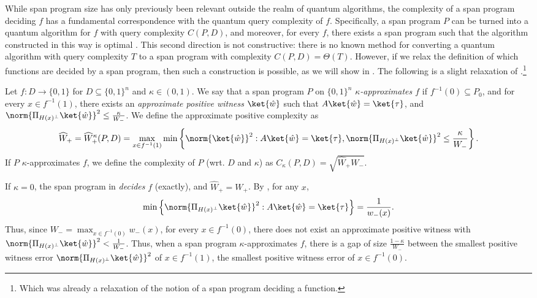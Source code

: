 \documentclass{toc}
\begin{document}
While span program size has only previously been relevant outside the realm of quantum algorithms, the complexity of a span program deciding $f$ has a fundamental correspondence with the quantum query complexity of $f$.  Specifically, a span program $P$ can be turned into a quantum algorithm for $f$ with query complexity $C(P,D)$, and moreover, for every $f$, there exists a span program such that the algorithm constructed in this way is optimal \cite{Rei09}. This second direction is not constructive: there is no known method for converting a quantum algorithm with query complexity $T$ to a span program with complexity $C(P,D)=\Theta(T)$. However, if we relax the definition of which functions are decided by a span program, then such a construction is possible, as we will show in . The following is a slight relaxation of \cite[Definition~2.6]{IJ15}.\footnote{Which was already a relaxation of the notion of a span program deciding a function.} %

\begin{definition}\label{def:approx-span}
Let $f:D\rightarrow\{0,1\}$ for $D\subseteq \{0,1\}^n$ and $\kappa\in(0,1)$. We say that a span program $P$ on $\{0,1\}^n$ \emph{$\kappa$-approximates $f$} if $f^{-1}(0)\subseteq P_0$, and for every $x\in f^{-1}(1)$, there exists an \emph{approximate positive witness} $\ket{\hat{w}}$ such that $A\ket{\hat{w}}=\ket{\tau}$, and $\norm{\Pi_{H(x)^\bot}\ket{\hat{w}}}^2\leq \frac{\kappa}{W_-}$. We define the approximate positive complexity as 
$$\widehat{W}_+=\widehat{W}_+^{\kappa}(P,D)=\max_{x\in f^{-1}(1)}\min\left\{\norm{\ket{\hat w}}^2 : A\ket{\hat w}=\ket{\tau}, \norm{\Pi_{H(x)^\bot}\ket{\hat{w}}}^2\leq \frac{\kappa}{W_-}\right\}.$$
If $P$ $\kappa$-approximates $f$, we define the complexity of $P$ (wrt. $D$ and $\kappa$) as $C_{\kappa}(P,D)=\sqrt{\widehat{W}_+W_-}$.
\end{definition}

If $\kappa=0$, the span program in  \emph{decides} $f$ (exactly), and $\widehat{W}_+=W_+$. By \cite[Theorem 2.10]{IJ15}, for any $x$,
$$\min\left\{\norm{\Pi_{H(x)^\bot}\ket{\hat{w}}}^2:A\ket{\hat{w}}=\ket{\tau}\right\}=\frac{1}{w_-(x)}.$$
Thus, since $W_-=\max_{x\in f^{-1}(0)}w_-(x)$, for every $x\in f^{-1}(0)$, there does not exist an approximate positive witness with $\norm{\Pi_{H(x)^\bot}\ket{\hat{w}}}^2<\frac{1}{W_-}$. Thus, when a span program $\kappa$-approximates $f$, there is a gap of size $\frac{1-\kappa}{W_-}$ between the smallest positive witness error $\norm{\Pi_{H(x)^\bot}\ket{\hat{w}}}^2$ of $x\in f^{-1}(1)$, the smallest positive witness error of $x\in f^{-1}(0)$. 
\end{document}
